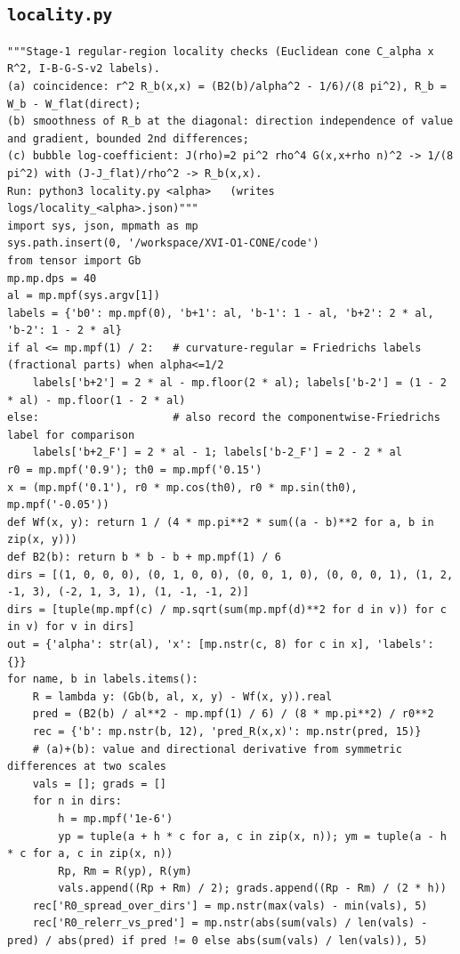 \documentclass[10pt]{article}
\begin{document}
\subsection{\texttt{locality.py}}
\begin{lstlisting}
"""Stage-1 regular-region locality checks (Euclidean cone C_alpha x R^2, I-B-G-S-v2 labels).
(a) coincidence: r^2 R_b(x,x) = (B2(b)/alpha^2 - 1/6)/(8 pi^2), R_b = W_b - W_flat(direct);
(b) smoothness of R_b at the diagonal: direction independence of value and gradient, bounded 2nd differences;
(c) bubble log-coefficient: J(rho)=2 pi^2 rho^4 G(x,x+rho n)^2 -> 1/(8 pi^2) with (J-J_flat)/rho^2 -> R_b(x,x).
Run: python3 locality.py <alpha>   (writes logs/locality_<alpha>.json)"""
import sys, json, mpmath as mp
sys.path.insert(0, '/workspace/XVI-O1-CONE/code')
from tensor import Gb
mp.mp.dps = 40
al = mp.mpf(sys.argv[1])
labels = {'b0': mp.mpf(0), 'b+1': al, 'b-1': 1 - al, 'b+2': 2 * al, 'b-2': 1 - 2 * al}
if al <= mp.mpf(1) / 2:   # curvature-regular = Friedrichs labels (fractional parts) when alpha<=1/2
    labels['b+2'] = 2 * al - mp.floor(2 * al); labels['b-2'] = (1 - 2 * al) - mp.floor(1 - 2 * al)
else:                     # also record the componentwise-Friedrichs label for comparison
    labels['b+2_F'] = 2 * al - 1; labels['b-2_F'] = 2 - 2 * al
r0 = mp.mpf('0.9'); th0 = mp.mpf('0.15')
x = (mp.mpf('0.1'), r0 * mp.cos(th0), r0 * mp.sin(th0), mp.mpf('-0.05'))
def Wf(x, y): return 1 / (4 * mp.pi**2 * sum((a - b)**2 for a, b in zip(x, y)))
def B2(b): return b * b - b + mp.mpf(1) / 6
dirs = [(1, 0, 0, 0), (0, 1, 0, 0), (0, 0, 1, 0), (0, 0, 0, 1), (1, 2, -1, 3), (-2, 1, 3, 1), (1, -1, -1, 2)]
dirs = [tuple(mp.mpf(c) / mp.sqrt(sum(mp.mpf(d)**2 for d in v)) for c in v) for v in dirs]
out = {'alpha': str(al), 'x': [mp.nstr(c, 8) for c in x], 'labels': {}}
for name, b in labels.items():
    R = lambda y: (Gb(b, al, x, y) - Wf(x, y)).real
    pred = (B2(b) / al**2 - mp.mpf(1) / 6) / (8 * mp.pi**2) / r0**2
    rec = {'b': mp.nstr(b, 12), 'pred_R(x,x)': mp.nstr(pred, 15)}
    # (a)+(b): value and directional derivative from symmetric differences at two scales
    vals = []; grads = []
    for n in dirs:
        h = mp.mpf('1e-6')
        yp = tuple(a + h * c for a, c in zip(x, n)); ym = tuple(a - h * c for a, c in zip(x, n))
        Rp, Rm = R(yp), R(ym)
        vals.append((Rp + Rm) / 2); grads.append((Rp - Rm) / (2 * h))
    rec['R0_spread_over_dirs'] = mp.nstr(max(vals) - min(vals), 5)
    rec['R0_relerr_vs_pred'] = mp.nstr(abs(sum(vals) / len(vals) - pred) / abs(pred) if pred != 0 else abs(sum(vals) / len(vals)), 5)

\end{lstlisting}
\end{document}
